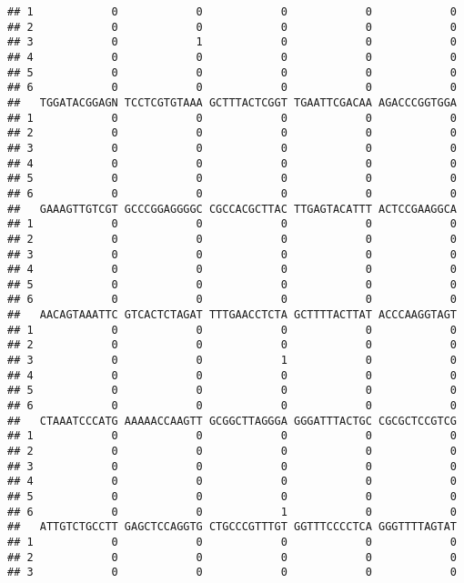 \documentclass[]{article}
\begin{document}
\begin{verbatim}
## 1            0            0            0            0            0
## 2            0            0            0            0            0
## 3            0            1            0            0            0
## 4            0            0            0            0            0
## 5            0            0            0            0            0
## 6            0            0            0            0            0
##   TGGATACGGAGN TCCTCGTGTAAA GCTTTACTCGGT TGAATTCGACAA AGACCCGGTGGA
## 1            0            0            0            0            0
## 2            0            0            0            0            0
## 3            0            0            0            0            0
## 4            0            0            0            0            0
## 5            0            0            0            0            0
## 6            0            0            0            0            0
##   GAAAGTTGTCGT GCCCGGAGGGGC CGCCACGCTTAC TTGAGTACATTT ACTCCGAAGGCA
## 1            0            0            0            0            0
## 2            0            0            0            0            0
## 3            0            0            0            0            0
## 4            0            0            0            0            0
## 5            0            0            0            0            0
## 6            0            0            0            0            0
##   AACAGTAAATTC GTCACTCTAGAT TTTGAACCTCTA GCTTTTACTTAT ACCCAAGGTAGT
## 1            0            0            0            0            0
## 2            0            0            0            0            0
## 3            0            0            1            0            0
## 4            0            0            0            0            0
## 5            0            0            0            0            0
## 6            0            0            0            0            0
##   CTAAATCCCATG AAAAACCAAGTT GCGGCTTAGGGA GGGATTTACTGC CGCGCTCCGTCG
## 1            0            0            0            0            0
## 2            0            0            0            0            0
## 3            0            0            0            0            0
## 4            0            0            0            0            0
## 5            0            0            0            0            0
## 6            0            0            1            0            0
##   ATTGTCTGCCTT GAGCTCCAGGTG CTGCCCGTTTGT GGTTTCCCCTCA GGGTTTTAGTAT
## 1            0            0            0            0            0
## 2            0            0            0            0            0
## 3            0            0            0            0            0

\end{verbatim}
\end{document}
